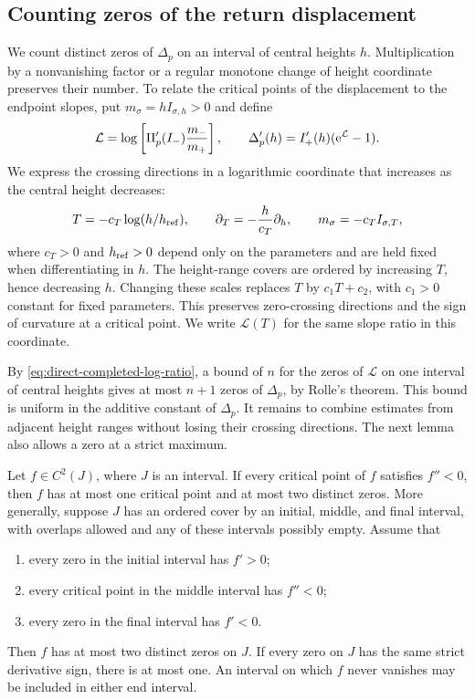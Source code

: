\subsection{Counting zeros of the return displacement}
\label{sec:direct-zero-counting}

We count distinct zeros of \(\Delta_p\) on an interval of central
heights \(h\). Multiplication by a nonvanishing factor or a regular
monotone change of height coordinate preserves their number. To relate
the critical points of the displacement to the endpoint slopes, put
\(m_\sigma=hI_{\sigma,h}>0\) and define
\begin{equation}
\label{eq:direct-completed-log-ratio}
 \mathcal L=\log\left[\Pi_p'(I_-)\frac{m_-}{m_+}\right],
 \qquad
 \Delta_p'(h)=I_+'(h)(\mathrm e^{\mathcal L}-1).
\end{equation}
We express the crossing directions in a logarithmic coordinate that
increases as the central height decreases:
\begin{equation}
\label{eq:direct-source-clock-convention}
 T=-c_T\log(h/h_{\rm ref}),\qquad
 \partial_T=-\frac{h}{c_T}\partial_h,\qquad
 m_\sigma=-c_T I_{\sigma,T},
\end{equation}
where \(c_T>0\) and \(h_{\rm ref}>0\) depend only on the
parameters and are held fixed when differentiating in \(h\). The
height-range covers are ordered by increasing \(T\), hence decreasing \(h\).
Changing these scales replaces \(T\) by \(c_1T+c_2\), with
\(c_1>0\) constant for fixed parameters. This preserves zero-crossing
directions and the sign of curvature at a critical point. We write
\(\mathcal L(T)\) for the same slope ratio in this coordinate.

By \eqref{eq:direct-completed-log-ratio}, a bound of \(n\) for the
zeros of \(\mathcal L\) on one interval of central heights gives at
most \(n+1\) zeros of \(\Delta_p\), by Rolle's theorem. This bound
is uniform in the additive constant of \(\Delta_p\). It remains to
combine estimates from adjacent height ranges without losing their
crossing directions. The next lemma also allows a zero at a strict
maximum.

\begin{lemma}
\label{lem:direct-oriented-zero-count}
Let \(f\in C^2(J)\), where \(J\) is an interval. If every
critical point of \(f\) satisfies \(f''<0\), then \(f\) has
at most one critical point and at most two distinct zeros.
More generally, suppose \(J\) has an ordered cover by an initial,
middle, and final interval, with overlaps allowed and any of these
intervals possibly empty. Assume that
\begin{enumerate}[label=(\roman*)]
\item every zero in the initial interval has \(f'>0\);
\item every critical point in the middle interval has \(f''<0\);
\item every zero in the final interval has \(f'<0\).
\end{enumerate}
Then \(f\) has at most two distinct zeros on \(J\).
If every zero on \(J\) has the same strict derivative sign,
there is at most one. An interval on which \(f\) never vanishes
may be included in either end interval.
\end{lemma}

